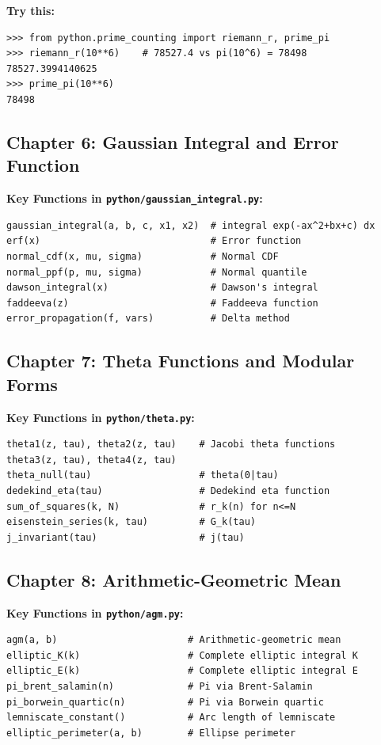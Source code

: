 \documentclass[11pt,a4paper]{article}
\begin{document}
\textbf{Try this:}
\begin{lstlisting}[style=python]
>>> from python.prime_counting import riemann_r, prime_pi
>>> riemann_r(10**6)    # 78527.4 vs pi(10^6) = 78498
78527.3994140625
>>> prime_pi(10**6)
78498
\end{lstlisting}

\subsection{Chapter 6: Gaussian Integral and Error Function}

\textbf{Key Functions in \texttt{python/gaussian\_integral.py}:}
\begin{lstlisting}[style=python]
gaussian_integral(a, b, c, x1, x2)  # integral exp(-ax^2+bx+c) dx
erf(x)                              # Error function
normal_cdf(x, mu, sigma)            # Normal CDF
normal_ppf(p, mu, sigma)            # Normal quantile
dawson_integral(x)                  # Dawson's integral
faddeeva(z)                         # Faddeeva function
error_propagation(f, vars)          # Delta method
\end{lstlisting}

\subsection{Chapter 7: Theta Functions and Modular Forms}

\textbf{Key Functions in \texttt{python/theta.py}:}
\begin{lstlisting}[style=python]
theta1(z, tau), theta2(z, tau)    # Jacobi theta functions
theta3(z, tau), theta4(z, tau)
theta_null(tau)                   # theta(0|tau)
dedekind_eta(tau)                 # Dedekind eta function
sum_of_squares(k, N)              # r_k(n) for n<=N
eisenstein_series(k, tau)         # G_k(tau)
j_invariant(tau)                  # j(tau)
\end{lstlisting}

\subsection{Chapter 8: Arithmetic-Geometric Mean}

\textbf{Key Functions in \texttt{python/agm.py}:}
\begin{lstlisting}[style=python]
agm(a, b)                       # Arithmetic-geometric mean
elliptic_K(k)                   # Complete elliptic integral K
elliptic_E(k)                   # Complete elliptic integral E
pi_brent_salamin(n)             # Pi via Brent-Salamin
pi_borwein_quartic(n)           # Pi via Borwein quartic
lemniscate_constant()           # Arc length of lemniscate
elliptic_perimeter(a, b)        # Ellipse perimeter
\end{lstlisting}
\end{document}

